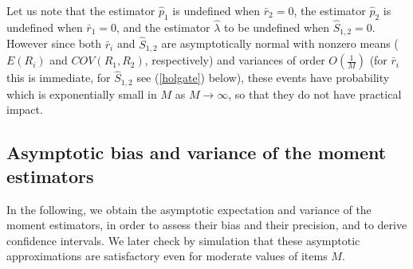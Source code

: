 \documentclass[a4paper,10pt,twoside]{article}
\begin{document}
Let us note that the estimator $\hat{p}_1$ is undefined when $\bar{r}_2=0$, the estimator $\hat{p}_2$ is undefined when $\bar{r}_1=0$, 
and the estimator $\hat{\lambda}$ to be undefined when $\hat{S}_{1,2}=0$. However since both $\bar{r}_i$ and $\hat{S}_{1,2}$
are asymptotically normal with nonzero means ($E(R_i)$ and $COV(R_1,R_2)$, respectively) and variances of order $O(\frac{1}{M})$
(for $\bar{r}_i$ this is immediate, for $\hat{S}_{1,2}$ see (\ref{holgate}) below), these events
have  probability which is exponentially small in $M$ as $M\rightarrow \infty$, so that they do not have practical impact. 


\subsection{Asymptotic bias and variance of the moment estimators}
\label{analysis}

In the following, we obtain the asymptotic expectation and variance of the moment estimators, in order to assess their bias and 
their precision, and to derive confidence intervals.  We later check by simulation that these
asymptotic approximations are satisfactory even for moderate values of items $M$.
\end{document}
